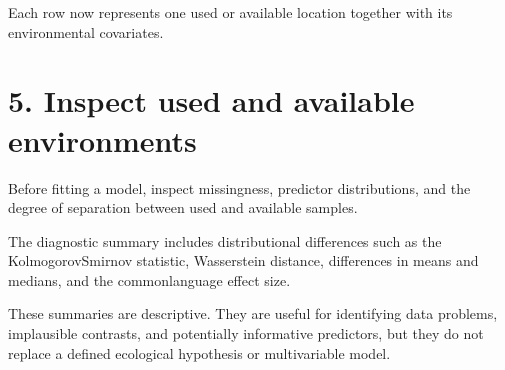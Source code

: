 \documentclass[letterpaper,10pt,english]{sphinxmanual}
\begin{document}
\begin{sphinxVerbatim}[commandchars=\\\{\}]
  

\end{sphinxVerbatim}

\sphinxAtStartPar
Each row now represents one used or available location together with its environmental covariates.


\section{5. Inspect used and available environments}
\label{\detokenize{getting_started:inspect-used-and-available-environments}}
\sphinxAtStartPar
Before fitting a model, inspect missingness, predictor distributions, and the degree of separation between used and available samples.

\begin{sphinxVerbatim}[commandchars=\\\{\}]
  

\PYG{p}{[}\PYG{p}{]}
\end{sphinxVerbatim}

\sphinxAtStartPar
The diagnostic summary includes distributional differences such as the Kolmogorov\textendash{}Smirnov statistic, Wasserstein distance, differences in means and medians, and the common\sphinxhyphen{}language effect size.

\sphinxAtStartPar
These summaries are descriptive. They are useful for identifying data problems, implausible contrasts, and potentially informative predictors, but they do not replace a defined ecological hypothesis or multivariable model.
\end{document}
